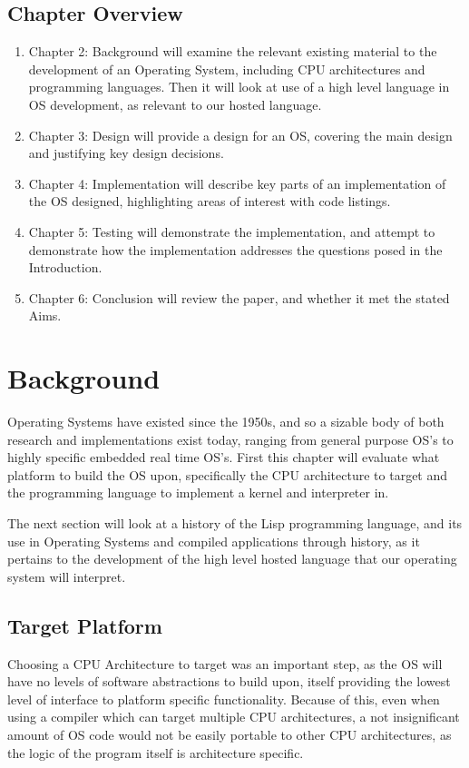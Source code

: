 \documentclass[10pt]{report}
\begin{document}
\section{Chapter Overview}
\begin{enumerate}
\item Chapter 2: Background will examine the relevant existing material to the development of an Operating System, including CPU architectures and programming languages. Then it will look at use of a high level language in OS development, as relevant to our hosted language.
\item Chapter 3: Design will provide a design for an OS, covering the main design and justifying key design decisions.
\item Chapter 4: Implementation will describe key parts of an implementation of the OS designed, highlighting areas of interest with code listings.
\item Chapter 5: Testing will demonstrate the implementation, and attempt to demonstrate how the implementation addresses the questions posed in the Introduction.
\item Chapter 6: Conclusion will review the paper, and whether it met the stated Aims.
\end{enumerate}


\chapter{Background}

Operating Systems have existed since the 1950s\cite{patrick1987general}, and so a sizable body of both research and implementations exist today, ranging from general purpose OS's to highly specific embedded real time OS's. First this chapter will evaluate what platform to build the OS upon, specifically the CPU architecture to target and the programming language to implement a kernel and interpreter in.

The next section will look at a history of the Lisp programming language, and its use in Operating Systems and compiled applications through history, as it pertains to the development of the high level hosted language that our operating system will interpret.

\section{Target Platform}
Choosing a CPU Architecture to target was an important step, as the OS will have no levels of software abstractions to build upon, itself providing the lowest level of interface to platform specific functionality. Because of this, even when using a compiler which can target multiple CPU architectures, a not insignificant amount of OS code would not be easily portable to other CPU architectures, as the logic of the program itself is architecture specific.
\end{document}

